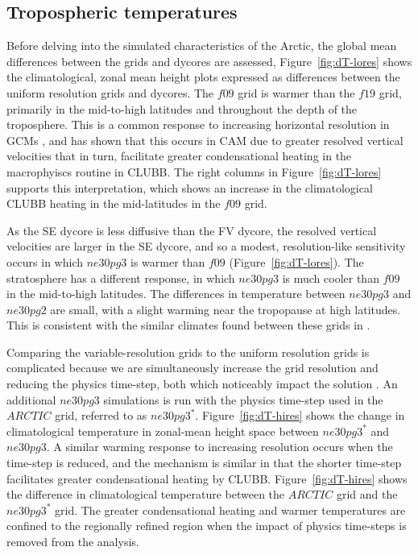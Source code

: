 \documentclass[draft]{agujournal2019}
\begin{document}
\subsection{Tropospheric temperatures}

Before delving into the simulated characteristics of the Arctic, the global mean differences between the grids and dycores are assessed, Figure~\ref{fig:dT-lores} shows the climatological, zonal mean height plots expressed as differences between the uniform resolution grids and dycores. The $f09$ grid is warmer than the $f19$ grid, primarily in the mid-to-high latitudes and throughout the depth of the troposphere. This is a common response to increasing horizontal resolution in GCMs \cite{PS2002CD,RETAL2006JC}, and \cite{HK2020QJRMS} has shown that this occurs in CAM due to greater resolved vertical velocities that in turn, facilitate greater condensational heating in the macrophyiscs routine in CLUBB. The right columns in Figure~\ref{fig:dT-lores} supports this interpretation, which shows an increase in the climatological CLUBB heating in the mid-latitudes in the $f09$ grid. 

As the SE dycore is less diffusive than the FV dycore, the resolved vertical velocities are larger in the SE dycore, and so a modest, resolution-like sensitivity occurs in which $ne30pg3$ is warmer than $f09$ (Figure~\ref{fig:dT-lores}). The stratosphere has a different response, in which $ne30pg3$ is much cooler than $f09$ in the mid-to-high latitudes. The differences in temperature between $ne30pg3$ and $ne30pg2$ are small, with a slight warming near the tropopause at high latitudes. This is consistent with the similar climates found between these grids in \cite{HETAL2019JAMES}.

Comparing the variable-resolution grids to the uniform resolution grids is complicated because we are simultaneously increase the grid resolution and reducing the physics time-step, both which noticeably impact the solution \cite{W2008TELLUS}. An additional $ne30pg3$ simulations is run with the physics time-step used in the $ARCTIC$ grid, referred to as $ne30pg3^{*}$. Figure~\ref{fig:dT-hires} shows the change in climatological temperature in zonal-mean height space between $ne30pg3^{*}$ and $ne30pg3$. A similar warming response to increasing resolution occurs when the time-step is reduced, and the mechanism is similar in that the shorter time-step facilitates greater condensational heating by CLUBB. Figure~\ref{fig:dT-hires} shows the difference in climatological temperature between the $ARCTIC$ grid and the $ne30pg3^{*}$ grid. The greater condensational heating and warmer temperatures are confined to the regionally refined region when the impact of physics time-steps is removed from the analysis.
\end{document}
